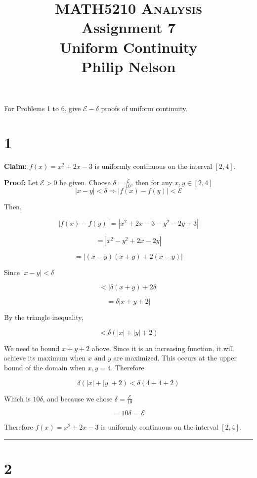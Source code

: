 \documentclass[10pt,letterpaper]{article}
\newcommand\E{\mathcal{E}}
\newcommand\qedsym{\hfill \rule{2mm}{2mm}}
\begin{document}
\title{MATH5210 \textsc{Analysis}
  \\ Assignment 7
  \\ Uniform Continuity
  \\ Philip Nelson
}

\date{}

\maketitle
For Problems 1 to 6, give $\E - \delta$ proofs of uniform continuity.
\section*{1}

\textbf{Claim:} $f(x) = x^2 + 2x -3$ is uniformly continuous on the interval $[2,4]$.

\medskip

\textbf{Proof:} Let $\E > 0$ be given. Choose $\delta = \frac{\E}{10}$, then for any $x, y \in [2,4]$ \[|x-y| < \delta \Rightarrow |f(x) - f(y)| < \E\]

Then,

\[|f(x)-f(y)| = |x^2 + 2x - 3 - y^2 - 2y + 3|\]

\[= |x^2 - y^2 + 2x - 2y|\]

\[= |(x-y)(x+y) + 2(x-y)|\]

Since $|x-y| < \delta$

\[< |\delta(x+y) + 2\delta|\]

\[= \delta|x + y + 2|\]

By the triangle inequality,

\[< \delta\left(|x| + |y| + 2\right)\]

We need to bound $x + y + 2$ above. Since it is an increasing function, it will achieve its maximum when $x$ and $y$ are maximized. This occurs at the upper bound of the domain when $x,y = 4$. Therefore

\[\delta\left(|x| + |y| + 2\right)<\delta(4+4+2)\]

Which is $10\delta$, and because we chose $\delta=\frac{\E}{10}$

\[=10\delta = \E\]

Therefore $f(x) = x^2 + 2x -3$ is uniformly continuous on the interval $[2,4]$.

\qedsym

\section*{2}
\end{document}
